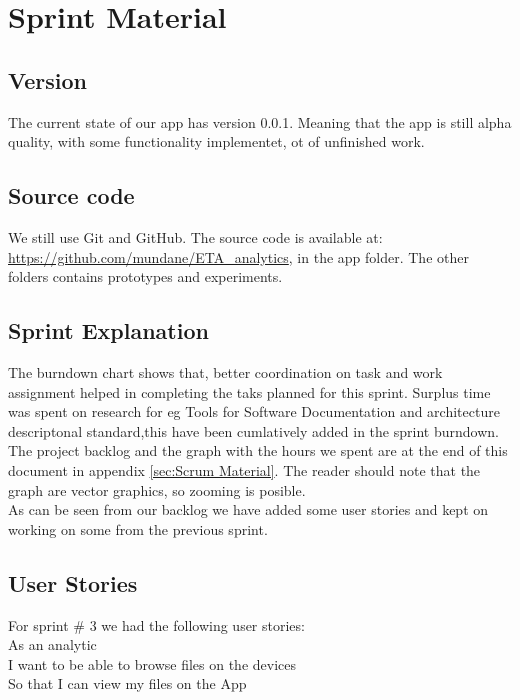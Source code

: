 \section{Sprint Material} %
\label{sec:Sprint Material}
\subsection{Version} %
\label{sub:Version}
The current state of our app has version 0.0.1. Meaning that the app is still alpha quality, with some functionality implementet, ot of unfinished work.
\subsection{Source code} %
\label{sub:Source code}
We still use Git and GitHub. The source code is available at: \url{https://github.com/mundane/ETA_analytics}, in the app folder. The other folders contains prototypes and experiments.
\subsection{Sprint Explanation}
The burndown chart shows that, better coordination on task and work assignment helped in completing the taks planned for this sprint.
Surplus time was spent on research for eg Tools for Software Documentation and architecture descriptonal standard,this have been cumlatively added in the sprint burndown.
The project backlog and the graph with the hours we spent are at the end of this document in appendix \ref{sec:Scrum Material}. The reader should note that the graph are vector graphics, so zooming is posible. \\
As can be seen from our backlog we have added some user stories and kept on working on some from the previous sprint.
\subsection{User Stories}
For sprint \# 3 we had the following user stories: \\
As an analytic \\
I want to be able to browse files on the devices\\
So that I can view my files on the App \\


